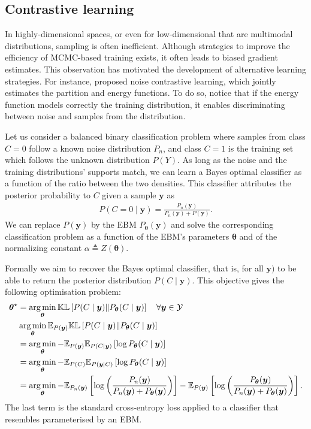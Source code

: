 \subsection{Contrastive learning}
In highly-dimensional spaces, or even for low-dimensional that are multimodal distributions, sampling is often inefficient. Although strategies to improve the efficiency of MCMC-based training exists, it often leads to biased gradient estimates. This observation has motivated the development of alternative learning strategies. For instance, \citet{gutmann2012noise} proposed noise contrastive learning, which jointly estimates the partition and energy functions. To do so, \citet{gutmann2012noise} notice that if the energy function models correctly the training distribution, it enables discriminating between noise and samples from the distribution.

Let us consider a balanced binary classification problem where samples from class $C=0$ follow a known noise distribution $P_n$, and class $C=1$ is the training set which follows the unknown distribution $P(Y)$. As long as the noise and the training distributions' supports match, we can learn a Bayes optimal classifier as a function of the ratio between the two densities. This classifier attributes the posterior probability to $C$ given a sample $\mathbf{y}$ as
\begin{align}
  P(C=0 \mid \mathbf{y}) = \frac{P_n(\mathbf{y})}{P_n(\mathbf{y}) + P(\mathbf{y})}. \label{eq:CL}
\end{align}
We can replace $P(\mathbf{y})$ by the EBM $P_{\bm{\theta}}(\bm{y})$ and solve the corresponding classification problem as a function of the EBM's parameters $\bm{\theta}$ and of the normalizing constant $\alpha \triangleq Z(\bm{\theta})$.

Formally we aim to recover the Bayes optimal classifier, that is, for all $\mathbf{y})$ to be able to return the posterior distribution $P(C \mid \mathbf{y})$. This objective gives the following optimisation problem:
\begin{align}
  \bm{\theta}^\star &= \argmin_{\bm{\theta}} \mathbb{KL}\left[ P(C \mid \mathbf{y}) \Vert P_{\bm{\theta}}(C \mid \mathbf{y}) \right] \quad \forall \mathbf{y} \in \mathcal{Y}\\
  &\argmin_{\bm{\theta}} \mathbb{E}_{P(\mathbf{y})}\mathbb{KL}\left[ P(C \mid \mathbf{y}) \Vert P_{\bm{\theta}}(C \mid \mathbf{y}) \right]\\
  &= \argmin_{\bm{\theta}} -\mathbb{E}_{P(\mathbf{y})}\mathbb{E}_{P(C \mid \mathbf{y})}\left[ \log P_{\bm{\theta}}(C \mid \mathbf{y}) \right]\\
  &= \argmin_{\bm{\theta}} -\mathbb{E}_{P(C)}\mathbb{E}_{P(\mathbf{y} \mid C)}\left[ \log P_{\bm{\theta}}(C \mid \mathbf{y}) \right]\\
  &= \argmin_{\bm{\theta}} -\mathbb{E}_{P_n(\mathbf{y})}\left[ \log \left( \frac{P_n(\mathbf{y})}{P_n(\mathbf{y}) + P_{\bm{\theta}}(\mathbf{y})} \right)  \right] -\mathbb{E}_{P(\mathbf{y})}\left[ \log \left( \frac{P_{\bm{\theta}}(\mathbf{y})}{P_n(\mathbf{y}) + P_{\bm{\theta}}(\mathbf{y})} \right) \right].
\end{align}
The last term is the standard cross-entropy loss applied to a classifier that resembles  parameterised by an EBM.

